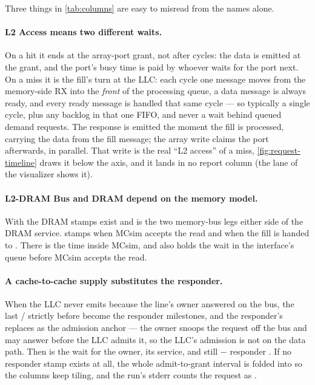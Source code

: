 Three things in \cref{tab:columns} are easy to misread from the names alone.

\paragraph{L2 Access means two different waits.} On a hit it ends at the array-port grant, not
after  cycles: the data is emitted at the grant, and the port's busy time is paid by
whoever waits for the port next. On a miss it is the fill's turn at the LLC: each cycle one
message moves from the memory-side RX into the \emph{front} of the processing queue, a data
message is always ready, and every ready message is handled that same cycle --- so typically a
single cycle, plus any backlog in that one FIFO, and never a wait behind queued demand
requests. The response is emitted the moment the fill is processed, carrying the data from the
fill message; the array write claims the port afterwards, in parallel. That write is the real
``L2 access'' of a miss, \cref{fig:request-timeline} draws it below the axis, and it lands in no
report column (the  lane of the visualizer shows it).

\paragraph{L2-DRAM Bus and DRAM depend on the memory model.} With 
the DRAM stamps exist and  is the two memory-bus legs either side of the DRAM
service.  stamps  when MCsim accepts the read and
 when the fill is handed to . There  is the time inside
MCsim, and  also holds the wait in the interface's queue before MCsim accepts
the read.

\paragraph{A cache-to-cache supply substitutes the responder.} When the LLC never emits because
the line's owner answered on the bus, the last / strictly before
 become the responder milestones, and the responder's 
replaces  as the admission anchor --- the owner snoops the request off the bus
and may answer before the LLC admits it, so the LLC's admission is not on the data path. Then
 is the wait for the owner,  its service, and 
still  $-$ responder . If no responder stamp exists at all, the
whole admit-to-grant interval is folded into  so the columns keep tiling, and the
run's stderr counts the request as .

